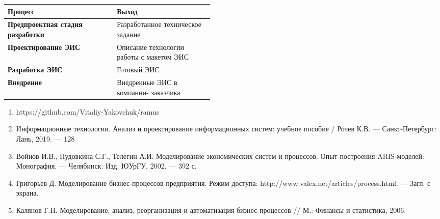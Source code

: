 \documentclass[a4paper,14pt]{extarticle}
\begin{document}
\begin{table}[h!]
	\begin{center}
		\begin{tabular}{|l|p{0.47\linewidth}|}
			\hline
			\textbf{Процесс} & Выход \\ \hline
			\textbf{Предпроектная стадия разработки} & Разработанное техническое задание \\ \hline
			\textbf{Проектирование ЭИС} &{Описание  технологии  работы  с макетом ЭИС} \\ \hline
			\textbf{Разработка ЭИС} & Готовый ЭИС \\ \hline
			\textbf{Внедрение} & Внедренные  ЭИС  в  компании- заказчика \\ \hline
		\end{tabular}
	\end{center}
	\label{}
\end{table}



\newpage


\begin{enumerate}
	\item https://github.com/Vitaliy-Yakovchuk/ramus
	\item Информационные технологии. Анализ и проектирование информационных систем: учебное пособие / Рочев К.В. --- Санкт-Петербург: Лань, 2019. --- 128

	
	\item Войнов И.В., Пудовкина С.Г., Телегин А.И. Моделирование экономических систем и процессов. Опыт построения ARIS-моделей: Монография. --- Челябинск: Изд. ЮУрГУ, 2002. --- 392 с.
	
	
	\item Григорьев Д. Моделирование бизнес-процессов предприятия. Режим доступа: http://www.valex.net/articles/process.html. --- Загл. с экрана.
	
	\item Калянов Г.Н. Моделирование, анализ, реорганизация и автоматизация бизнес-процессов // М.: Финансы и статистика, 2006.
\end{enumerate}


\end{document}
